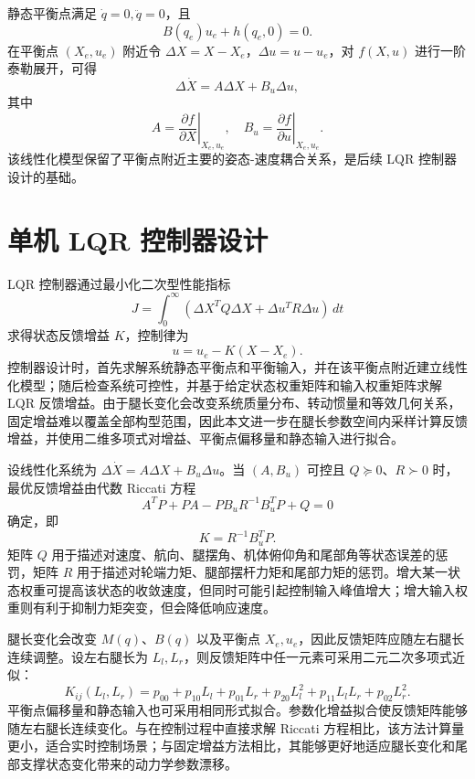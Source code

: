 \documentclass[type=bachelor]{bithesis}
\begin{document}
静态平衡点满足 $\dot{q}=0,\ddot{q}=0$，且
\begin{equation}
  B(q_e)u_e+h(q_e,0)=0 .
\end{equation}
在平衡点 $(X_e,u_e)$ 附近令 $\Delta X=X-X_e$，$\Delta u=u-u_e$，对 $f(X,u)$ 进行一阶泰勒展开，可得
\begin{equation}
  \Delta\dot{X}=A\Delta X+B_u\Delta u,
\end{equation}
其中
\begin{equation}
  A=\left.\frac{\partial f}{\partial X}\right|_{X_e,u_e},\quad
  B_u=\left.\frac{\partial f}{\partial u}\right|_{X_e,u_e}.
\end{equation}
该线性化模型保留了平衡点附近主要的姿态-速度耦合关系，是后续 LQR 控制器设计的基础。

\section{单机 LQR 控制器设计}
LQR 控制器通过最小化二次型性能指标
\begin{equation}
  J=\int_0^\infty (\Delta X^TQ\Delta X+\Delta u^TR\Delta u)\,dt
\end{equation}
求得状态反馈增益 $K$，控制律为
\begin{equation}
  u=u_e-K(X-X_e) .
\end{equation}
控制器设计时，首先求解系统静态平衡点和平衡输入，并在该平衡点附近建立线性化模型；随后检查系统可控性，并基于给定状态权重矩阵和输入权重矩阵求解 LQR 反馈增益。由于腿长变化会改变系统质量分布、转动惯量和等效几何关系，固定增益难以覆盖全部构型范围，因此本文进一步在腿长参数空间内采样计算反馈增益，并使用二维多项式对增益、平衡点偏移量和静态输入进行拟合。

设线性化系统为 $\Delta\dot{X}=A\Delta X+B_u\Delta u$。当 $(A,B_u)$ 可控且 $Q\succeq0$、$R\succ0$ 时，最优反馈增益由代数 Riccati 方程
\begin{equation}
  A^TP+PA-PB_uR^{-1}B_u^TP+Q=0
\end{equation}
确定，即
\begin{equation}
  K=R^{-1}B_u^TP .
\end{equation}
矩阵 $Q$ 用于描述对速度、航向、腿摆角、机体俯仰角和尾部角等状态误差的惩罚，矩阵 $R$ 用于描述对轮端力矩、腿部摆杆力矩和尾部力矩的惩罚。增大某一状态权重可提高该状态的收敛速度，但同时可能引起控制输入峰值增大；增大输入权重则有利于抑制力矩突变，但会降低响应速度。

腿长变化会改变 $M(q)$、$B(q)$ 以及平衡点 $X_e,u_e$，因此反馈矩阵应随左右腿长连续调整。设左右腿长为 $L_l,L_r$，则反馈矩阵中任一元素可采用二元二次多项式近似：
\begin{equation}
  K_{ij}(L_l,L_r)=
  p_{00}+p_{10}L_l+p_{01}L_r+p_{20}L_l^2+p_{11}L_lL_r+p_{02}L_r^2 .
\end{equation}
平衡点偏移量和静态输入也可采用相同形式拟合。参数化增益拟合使反馈矩阵能够随左右腿长连续变化。与在控制过程中直接求解 Riccati 方程相比，该方法计算量更小，适合实时控制场景；与固定增益方法相比，其能够更好地适应腿长变化和尾部支撑状态变化带来的动力学参数漂移。
\end{document}
